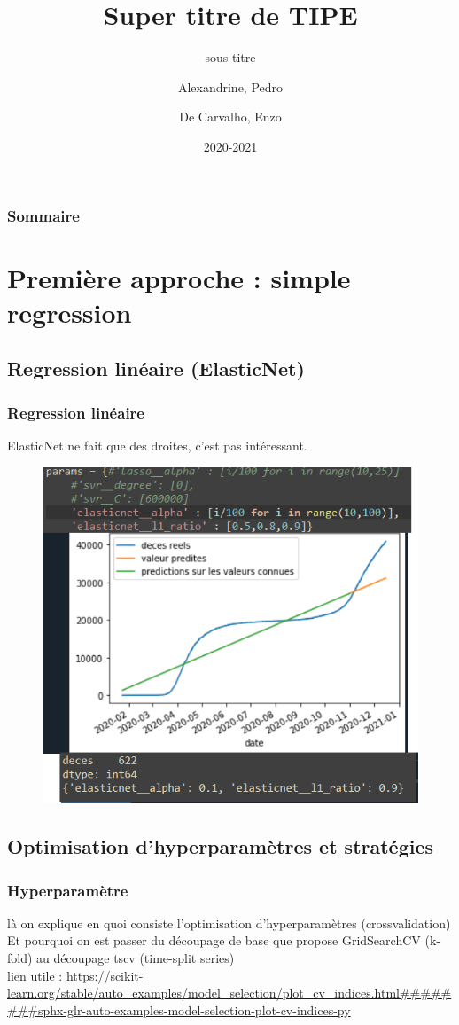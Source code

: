 \documentclass{beamer}
\title{Super titre de TIPE}
\subtitle{sous-titre}
\author{Alexandrine, Pedro\\\and De Carvalho, Enzo}
\date{2020-2021}
\begin{document}
\begin{frame}
	\maketitle
\end{frame}

\begin{frame}
	\frametitle{Sommaire}
	\tableofcontents
\end{frame}

\section{Première approche : simple regression}
\subsection{Regression linéaire (ElasticNet)}
\begin{frame}
	\frametitle{Regression linéaire}
	ElasticNet ne fait que des droites, c'est pas intéressant.
	\begin{figure}[b]
		\includegraphics[scale=0.4]{EN}
		\centering
	\end{figure}
\end{frame}

\subsection{Optimisation d'hyperparamètres et stratégies}
\begin{frame}
	\frametitle{Hyperparamètre}
	là on explique en quoi consiste l'optimisation d'hyperparamètres (crossvalidation)
	Et pourquoi on est passer du découpage de base que propose GridSearchCV (k-fold) au découpage tscv (time-split series)
	\\
	\alert{lien utile : }
	\url{https://scikit-learn.org/stable/auto_examples/model_selection/plot_cv_indices.html########sphx-glr-auto-examples-model-selection-plot-cv-indices-py}
\end{frame}
\end{document}
